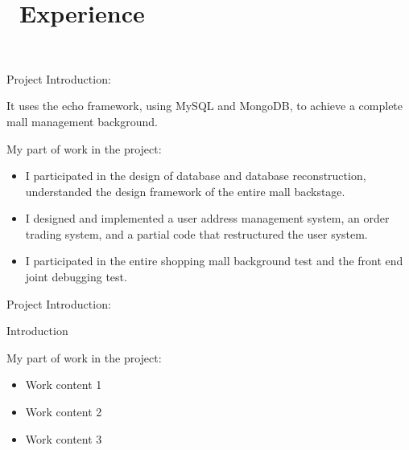 \documentclass{resume}
\begin{document}
\section{\faUsers\ Experience} \vspace{1mm}

\faLink\ 

\vspace{1mm}\par
\noindent
Project Introduction:

\vspace{1mm}\par
\setlength{\parindent}{2ex}
It uses the echo framework, using MySQL and MongoDB, to achieve a complete mall management background.

\vspace{1mm}\par
\noindent
My part of work in the project:

\begin{itemize}[parsep=1ex]
  \item I participated in the design of database and database reconstruction, understanded the design framework of the entire mall backstage.
  \item I designed and implemented a user address management system, an order trading system, and a partial code that restructured the user system.
  \item I participated in the entire shopping mall background test and the front end joint debugging test.
\end{itemize}


\vspace{1mm}\par
\noindent
Project Introduction:

\vspace{1mm}\par
\setlength{\parindent}{2ex}
Introduction

\vspace{1mm}\par
\noindent
My part of work in the project:

\begin{itemize}[parsep=1ex]
  \item Work content 1
  \item Work content 2
  \item Work content 3
\end{itemize}
\end{document}
